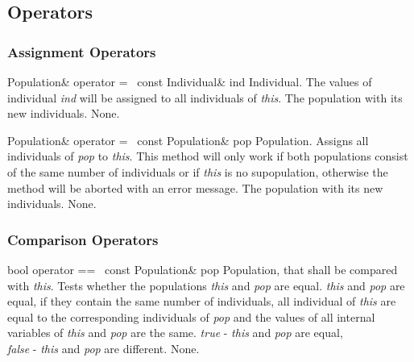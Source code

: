 \subsection{Operators}

\subsubsection{Assignment Operators}

\setNormalInstance
\printMethodWithOneParam
{Population\&}
{operator =\ }
{const Individual\&}
{ind}
{Individual.}
{The values of individual {\em ind} will be assigned to all individuals 
 of {\em this}.}
{The population with its new individuals.}
{None.}

\vspace*{4ex}

\setNormalInstance
\printMethodWithOneParam
{Population\&}
{operator =\ }
{const Population\&}
{pop}
{Population.}
{Assigns all individuals of {\em pop} to {\em this}. This method will
 only work if both populations consist of the same number of individuals
 or if {\em this} is no supopulation, otherwise the method will be
 aborted with an error message.}
{The population with its new individuals.}
{None.}

\clearpage

\subsubsection{Comparison Operators}

\setConstInstance
\printMethodWithOneParam
{bool}
{operator ==\ }
{const Population\&}
{pop}
{Population, that shall be compared with {\em this}.}
{Tests whether the populations {\em this} and {\em pop}
 are equal. {\em this} and {\em pop} are equal, if
 they contain the same number of individuals, all individual
 of {\em this} are equal to the corresponding individuals of
 {\em pop} and the values of all internal variables of {\em this}
 and {\em pop} are the same.}
{{\em true} - {\em this} and {\em pop} are equal,\\
 {\em false} - {\em this} and {\em pop} are different.}
{None.}

